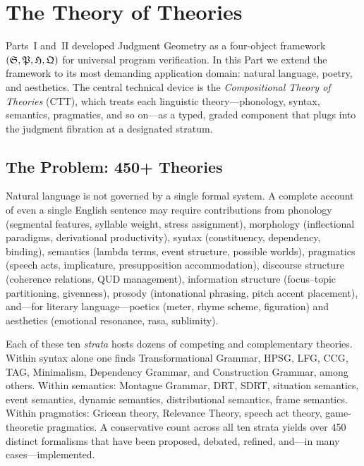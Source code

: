 
\chapter{The Theory of Theories}
\label{ch:theory-of-theories}

Parts~I and~II developed Judgment Geometry as a four-object framework
$(\mathfrak{S}, \mathfrak{P}, \mathfrak{H}, \mathfrak{Q})$ for universal program verification.
In this Part we extend the framework to its most demanding application
domain: natural language, poetry, and aesthetics.  The central
technical device is the \emph{Compositional Theory of Theories}
(CTT), which treats each linguistic theory---phonology,
syntax, semantics, pragmatics, and so on---as a typed, graded
component that plugs into the judgment fibration at a designated
stratum.

\section{The Problem: 450+ Theories}
\label{sec:ctt-problem}

Natural language is not governed by a single formal system.
A complete account of even a single English sentence may require
contributions from phonology (segmental features, syllable weight,
stress assignment), morphology (inflectional paradigms, derivational
productivity), syntax (constituency, dependency, binding), semantics
(lambda terms, event structure, possible worlds), pragmatics (speech
acts, implicature, presupposition accommodation), discourse structure
(coherence relations, QUD management), information structure
(focus--topic partitioning, givenness), prosody (intonational
phrasing, pitch accent placement), and---for literary
language---poetics (meter, rhyme scheme, figuration) and aesthetics
(emotional resonance, rasa, sublimity).

Each of these ten \emph{strata} hosts dozens of competing and
complementary theories.  Within syntax alone one finds
Transformational Grammar, HPSG, LFG, CCG, TAG, Minimalism,
Dependency Grammar, and Construction Grammar, among others.  Within
semantics: Montague Grammar, DRT, SDRT, situation semantics, event
semantics, dynamic semantics, distributional semantics, frame
semantics.  Within pragmatics: Gricean theory, Relevance Theory,
speech act theory, game-theoretic pragmatics.  A conservative count
across all ten strata yields over 450 distinct formalisms that have
been proposed, debated, refined, and---in many cases---implemented.

